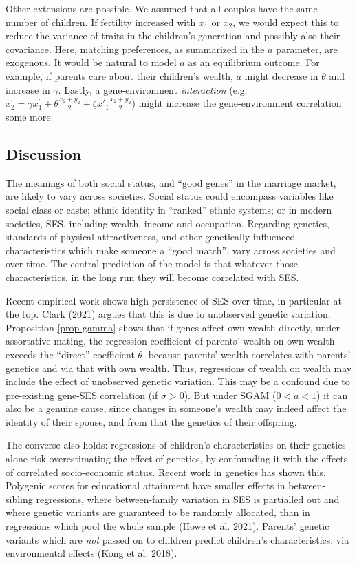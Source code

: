 \documentclass[
]{article}
\theoremstyle{definition}
\theoremstyle{definition}
\theoremstyle{definition}
\theoremstyle{definition}
\theoremstyle{remark}
\begin{document}
Other extensions are possible. We assumed that all couples have the same number
of children. If fertility increased with \(x_1\) or \(x_2\), we would expect this to
reduce the variance of traits in the children's generation and possibly also
their covariance. Here, matching preferences, as summarized in the \(a\) parameter,
are exogenous. It would be natural to model \(a\) as an equilibrium outcome.
For example, if parents care about their children's wealth, \(a\) might decrease
in \(\theta\) and increase in \(\gamma\). Lastly, a gene-environment \emph{interaction}
(e.g.~\(x^\prime_2 = \gamma x^\prime_1 + \theta\frac{x_2+y_2}{2} + \zeta x'_1\frac{x_2+y_2}{2}\)) might increase the gene-environment
correlation some more.

\hypertarget{discussion}{%
\subsection{Discussion}\label{discussion}}

The meanings of both social status, and ``good genes'' in the
marriage market, are likely to vary across societies. Social status could
encompass variables like social class or caste; ethnic identity in
``ranked'' ethnic systems; or in modern societies, SES, including wealth, income
and occupation. Regarding genetics, standards of physical attractiveness, and
other genetically-influenced characteristics which make someone a ``good match'',
vary across societies and over time. The central prediction of the model is that
whatever those characteristics, in the long run they will become correlated with
SES.

Recent empirical work shows high persistence of SES over time, in particular at
the top. Clark (2021) argues that this is due to unobserved genetic variation.
Proposition \ref{prop-gamma} shows that if genes affect own wealth directly,
under assortative mating, the regression coefficient of parents' wealth on own
wealth exceeds the ``direct'' coefficient \(\theta\), because parents' wealth
correlates with parents' genetics and via that with own wealth. Thus,
regressions of wealth on wealth may include the effect of unobserved genetic
variation. This may be a confound due to pre-existing gene-SES correlation (if
\(\sigma > 0\)). But under SGAM (\(0 < a < 1\)) it can also be a genuine cause,
since changes in someone's wealth may indeed affect the identity of their
spouse, and from that the genetics of their offspring.

The converse also holds: regressions of children's characteristics on their
genetics alone risk overestimating the effect of genetics, by confounding it
with the effects of correlated socio-economic status. Recent work in genetics
has shown this. Polygenic scores for educational attainment have smaller effects
in between-sibling regressions, where between-family variation in SES is
partialled out and where genetic variants are guaranteed to be randomly
allocated, than in regressions which pool the whole sample (Howe et al. 2021).
Parents' genetic variants which are \emph{not} passed on to children predict
children's characteristics, via environmental effects (Kong et al. 2018).
\end{document}
